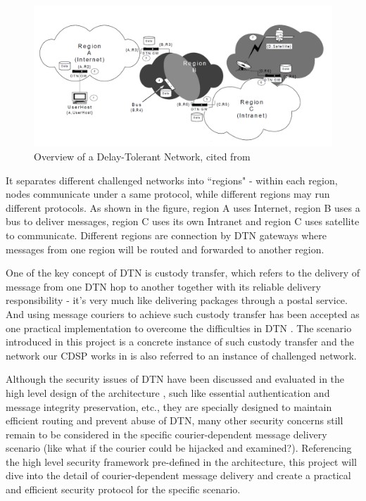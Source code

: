 \begin{figure}[h!]
\centering
\includegraphics[width=\textwidth,natwidth=1420,natheight=672]{figures/dtn.png}
\caption{Overview of a Delay-Tolerant Network, cited from \cite{Kevin}}
\label{fig:dtn}
\end{figure}

It separates different challenged networks into ``regions" - within each region, nodes communicate under a same protocol, while different regions may run different protocols. As shown in the figure, region A uses Internet, region B uses a bus to deliver messages, region C uses its own Intranet and region C uses satellite to communicate. Different regions are connection by DTN gateways where messages from one region will be routed and forwarded to another region.

One of the key concept of DTN is custody transfer, which refers to the delivery of message from one DTN hop to another together with its reliable delivery responsibility - it's very much like delivering packages through a postal service. And using message couriers to achieve such custody transfer has been accepted as one practical implementation to overcome the difficulties in DTN \cite{Jain}\cite{Zhao}. The scenario introduced in this project is a concrete instance of such custody transfer and the network our CDSP works in is also referred to an instance of challenged network.

Although the security issues of DTN have been discussed and evaluated in the high level design of the architecture \cite{Cerf}\cite{Scottrfc}, such like essential authentication and message integrity preservation, etc., they are specially designed to maintain efficient routing and prevent abuse of DTN, many other security concerns still remain to be considered in the specific courier-dependent message delivery scenario (like what if the courier could be hijacked and examined?). Referencing the high level security framework pre-defined in the architecture, this project will dive into the detail of courier-dependent message delivery and create a practical and efficient security protocol for the specific scenario.


